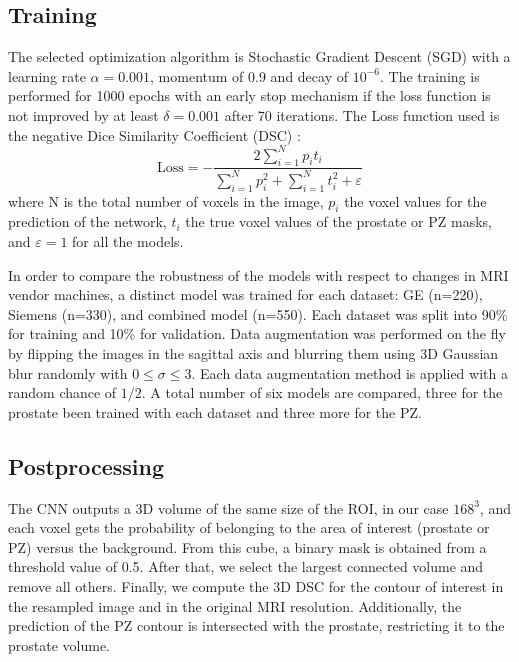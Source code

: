 \subsection{Training}
\label{subsec:training}
The selected optimization algorithm is Stochastic Gradient Descent (SGD) with a learning rate $\alpha = 0.001$, momentum of 0.9 and decay of $10^{-6}$. The training is performed for 1000 epochs with an early stop mechanism if the loss function is not improved by at least $\delta = 0.001$ after 70 iterations. The Loss function used is the negative Dice Similarity Coefficient (DSC) \cite{dice1945measures}:  
\begin{equation}
\text{Loss} = - \frac{2 \sum_{i=1}^{N}p_it_i}{\sum_{i=1}^{N}p_i^2 + \sum_{i=1}^{N}t_i^2 + \varepsilon} 
\label{eq:dsc}
\end{equation}
where N is the total number of voxels in the image, $p_i$ the voxel values for the prediction of the network, $t_i$ the true voxel values of the prostate or PZ masks, and $\varepsilon = 1$ for all the models.

In order to compare the robustness of the models with respect to changes in MRI vendor machines,  a distinct model was trained for each dataset: GE (n=220), Siemens (n=330), and combined model (n=550). Each dataset was split into 90\% for training and 10\% for validation. Data augmentation was performed on the fly by flipping the images in the sagittal axis and blurring them using 3D Gaussian blur randomly with $0 \leq \sigma \leq 3$. Each data augmentation method is applied with a random chance of $1/2$.  
A total number of six models are compared, three for the prostate been trained with each dataset and three more for the PZ. 

\subsection{Postprocessing}
The CNN outputs a 3D volume of the same size of the ROI, in our case $168^3$, and each voxel gets the probability of belonging to the area of interest (prostate or PZ) versus the background. From this cube, a binary mask is obtained from a threshold value of 0.5. After that, we select the largest connected volume and remove all others. Finally, we compute the 3D DSC for the contour of interest in the resampled image and in the original MRI resolution. Additionally, the prediction of the PZ contour is intersected with the prostate, restricting it to the prostate volume.